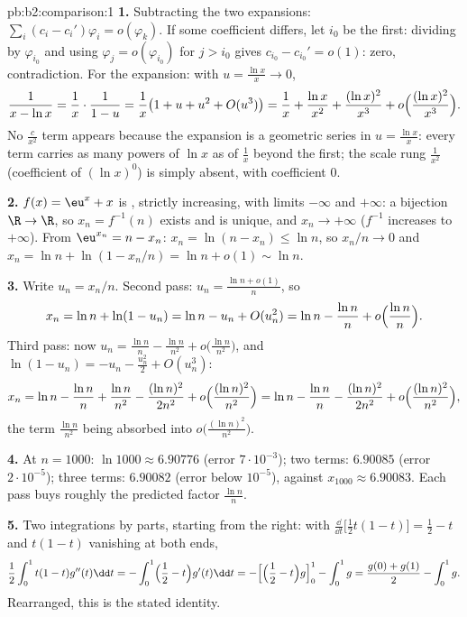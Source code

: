\begin{solution}{pb:b2:comparison:1}
\textbf{1.} Subtracting the two expansions: $\sum_i (c_i -
c_i')\varphi_i = o(\varphi_k)$. If some coefficient differs, let
$i_0$ be the first: dividing by $\varphi_{i_0}$ and using
$\varphi_j = o(\varphi_{i_0})$ for $j > i_0$ gives $c_{i_0} -
c_{i_0}' = o(1)$: zero, contradiction. For the expansion: with
$u = \frac{\ln x}x \to 0$,
\[
\frac{1}{x - \ln x} = \frac1x\cdot\frac{1}{1 - u}
= \frac1x\bigl(1 + u + u^2 + O(u^3)\bigr)
= \frac1x + \frac{\ln x}{x^2} + \frac{(\ln x)^2}{x^3} +
o\Bigl(\frac{(\ln x)^2}{x^3}\Bigr).
\]
No $\frac c{x^2}$ term appears because the expansion is a
geometric series in $u = \frac{\ln x}{x}$: every term carries as
many powers of $\ln x$ as of $\frac1x$ beyond the first; the
scale rung $\frac1{x^2}$ (coefficient of $(\ln x)^0$) is simply
absent, with coefficient $0$.

\textbf{2.} $f(x) = \eu^x + x$ is , strictly
increasing, with limits $-\infty$ and $+\infty$: a bijection
$\R \to \R$, so $x_n = f^{-1}(n)$ exists and is unique, and
$x_n \to +\infty$ ($f^{-1}$ increases to $+\infty$). From
$\eu^{x_n} = n - x_n$: $x_n = \ln(n - x_n) \leq \ln n$, so
$x_n/n \to 0$ and $x_n = \ln n + \ln(1 - x_n/n) = \ln n + o(1)
\sim \ln n$.

\textbf{3.} Write $u_n = x_n/n$. Second pass: $u_n = \frac{\ln n
+ o(1)}{n}$, so
\[
x_n = \ln n + \ln(1 - u_n) = \ln n - u_n + O(u_n^2)
= \ln n - \frac{\ln n}{n} + o\Bigl(\frac{\ln n}n\Bigr).
\]
Third pass: now $u_n = \frac{\ln n}{n} - \frac{\ln n}{n^2} +
o\bigl(\frac{\ln n}{n^2}\bigr)$, and $\ln(1 - u_n) = -u_n -
\frac{u_n^2}2 + O(u_n^3)$:
\[
x_n = \ln n - \frac{\ln n}n + \frac{\ln n}{n^2}
- \frac{(\ln n)^2}{2n^2} + o\Bigl(\frac{(\ln
n)^2}{n^2}\Bigr)
= \ln n - \frac{\ln n}{n} - \frac{(\ln n)^2}{2n^2} +
o\Bigl(\frac{(\ln n)^2}{n^2}\Bigr),
\]
the term $\frac{\ln n}{n^2}$ being absorbed into
$o\bigl(\frac{(\ln n)^2}{n^2}\bigr)$.

\textbf{4.} At $n = 1000$: $\ln 1000 \approx 6.90776$ (error
$7\cdot10^{-3}$); two terms: $6.90085$ (error
$2\cdot10^{-5}$); three terms: $6.90082$ (error below
$10^{-5}$), against $x_{1000} \approx 6.90083$. Each pass buys
roughly the predicted factor $\frac{\ln n}{n}$.

\textbf{5.} Two integrations by parts, starting from the right:
with $\frac{\dd}{\dd t}\bigl[\tfrac12t(1-t)\bigr] = \tfrac12 -
t$ and $t(1-t)$ vanishing at both ends,
\[
\frac12\int_0^1 t(1-t)g''(t)\dd t
= -\int_0^1\Bigl(\frac12 - t\Bigr)g'(t)\dd t
= -\Bigl[\Bigl(\frac12 - t\Bigr)g\Bigr]_0^1 - \int_0^1 g
= \frac{g(0) + g(1)}2 - \int_0^1 g .
\]
Rearranged, this is the stated identity.


\end{solution}
